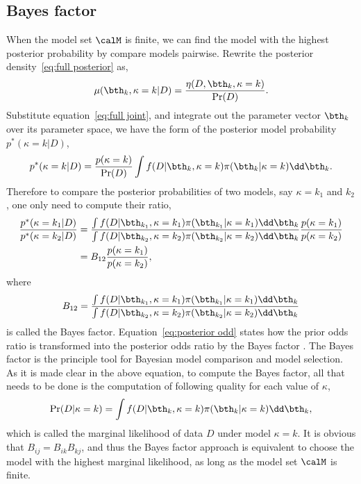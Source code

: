\subsection{Bayes factor}
\label{sub:Bayes factor}

When the model set $\calM$ is finite, we can find the model with the highest
posterior probability by compare models pairwise. Rewrite the posterior
density~\eqref{eq:full posterior} as,
\begin{equation}
  \mu(\bth_k,\kappa=k|D) = \frac{\eta(D,\bth_k,\kappa=k)}{\Pr(D)}.
\end{equation}
Substitute equation~\eqref{eq:full joint}, and integrate out the parameter
vector $\bth_k$ over its parameter space, we have the form of the posterior
model probability $p^*(\kappa=k|D)$,
\begin{equation}
  p^*(\kappa=k|D) = \frac{p(\kappa = k)}{\Pr(D)}
  \int f(D|\bth_k,\kappa = k)\pi(\bth_k|\kappa = k)\dd\bth_k.
\end{equation}
Therefore to compare the posterior probabilities of two models, say $\kappa =
k_1$ and $k_2$, one only need to compute their ratio,
\begin{align}
  \frac{p^*(\kappa = k_1|D)}{p^*(\kappa = k_2|D)} &= \frac
  {\int f(D|\bth_{k_1},\kappa=k_1)\pi(\bth_{k_1}|\kappa=k_1)\dd\bth_k}
  {\int f(D|\bth_{k_2},\kappa=k_2)\pi(\bth_{k_2}|\kappa=k_2)\dd\bth_k}
  \frac{p(\kappa=k_1)}{p(\kappa=k_2)} \notag\\
  & = B_{12} \frac{p(\kappa=k_1)}{p(\kappa=k_2)},
  \label{eq:posterior odd}
\end{align}
where
\begin{equation}
  B_{12} = \frac
  {\int f(D|\bth_{k_1},\kappa=k_1)\pi(\bth_{k_1}|\kappa=k_1)\dd\bth_k}
  {\int f(D|\bth_{k_2},\kappa=k_2)\pi(\bth_{k_2}|\kappa=k_2)\dd\bth_k}
  \label{eq:bayes factor}
\end{equation}
is called the Bayes factor. Equation~\eqref{eq:posterior odd} states how the
prior odds ratio is transformed into the posterior odds ratio by the Bayes
factor \parencite{Kass:1995vb}. The Bayes factor is the principle tool for
Bayesian model comparison and model selection. As it is made clear in the
above equation, to compute the Bayes factor, all that needs to be done is the
computation of following quality for each value of $\kappa$,
\begin{equation}
  \Pr(D|\kappa = k)
  = \int f(D|\bth_k,\kappa=k)\pi(\bth_k|\kappa=k)\dd\bth_k,
  \label{eq:marginal likelihood}
\end{equation}
which is called the marginal likelihood of data $D$ under model $\kappa = k$.
It is obvious that $B_{ij} = B_{ik} B_{kj}$, and thus the Bayes factor
approach is equivalent to choose the model with the highest marginal
likelihood, as long as the model set $\calM$ is finite.

